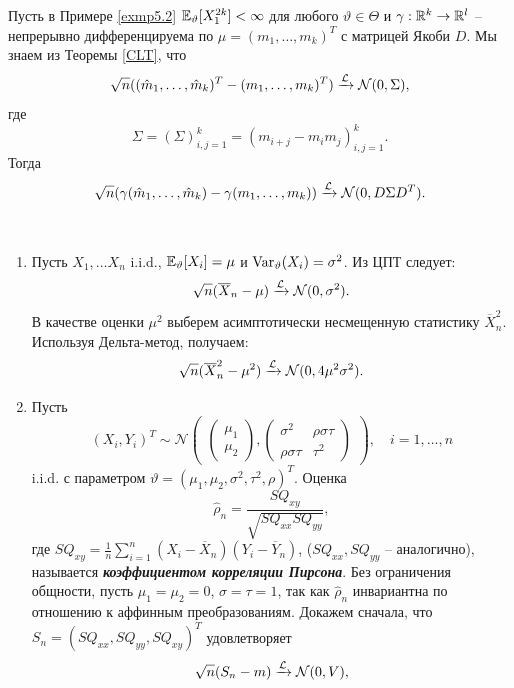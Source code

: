 \begin{rmrk}
	Пусть в Примере \ref{exmp5.2} $\mathbb{E}_\vartheta[X_1^{2k}] < \infty$ для любого $\vartheta \in \Theta$ и $\gamma:\mathbb{R}^k \rightarrow \mathbb{R}^l$ -- непрерывно дифференцируема по $\mu = (m_1, \dots, m_k)^T$ с матрицей Якоби $D$. Мы знаем из Теоремы \ref{CLT}, что
	\[ \sqrt{n}((\hat{m}_1, \dots, \hat{m}_k)^T - (m_1, \dots, m_k)^T) \xrightarrow{\mathcal{L}} \mathcal{N}(0, \Sigma),  \]
	где
	\[ \Sigma = (\Sigma)_{i,j=1}^k = (m_{i+j} - m_i m_j)_{i,j=1}^k. \]
	Тогда
	\[ \sqrt{n}(\gamma(\hat{m}_1, \dots, \hat{m}_k) - \gamma(m_1, \dots, m_k)) \xrightarrow{\mathcal{L}} \mathcal{N}(0, D \Sigma D^T).\]
\end{rmrk}

\begin{exmp}\
	\begin{enumerate}
		\item Пусть $X_1, \dots X_n$ i.i.d., $\mathbb{E}_\vartheta[X_i]=\mu$ и $\operatorname{Var}_\vartheta(X_i)=\sigma^2$. Из ЦПТ следует:
		\[ \sqrt{n}(\overline{X}_n - \mu) \xrightarrow{\mathcal{L}} \mathcal{N}(0, \sigma^2). \]
		В качестве оценки $\mu^2$ выберем асимптотически несмещенную статистику $\overline{X}_n^2$. Используя Дельта-метод, получаем:
		\[ \sqrt{n}(\overline{X}_n^2-\mu^2) \xrightarrow{\mathcal{L}} \mathcal{N}(0, 4\mu^2\sigma^2). \]
		\item Пусть \[(X_i, Y_i)^T \sim \mathcal{N}
		\begin{pmatrix}
		\begin{pmatrix}
		\mu_1 \\ \mu_2
		\end{pmatrix},
		\begin{pmatrix}
		\sigma^2 & \rho \sigma \tau \\
		\rho \sigma \tau & \tau^2
		\end{pmatrix}
		\end{pmatrix}, \quad
		i = 1, \dots, n \] i.i.d. с параметром $\vartheta = (\mu_1, \mu_2, \sigma^2, \tau^2, \rho)^T$. Оценка
		\[ \hat{\rho}_n = \frac{SQ_{xy}}{\sqrt{SQ_{xx} SQ_{yy}}},  \]
	    где $SQ_{xy} = \frac{1}{n} \sum_{i=1}^{n}(X_i-\overline{X}_n)(Y_i - \overline{Y}_n)$, ($SQ_{xx}, SQ_{yy}$ -- аналогично), называется \textbf{\textit{коэффициентом корреляции Пирсона}}. Без ограничения общности, пусть $\mu_1 = \mu_2 = 0$, $\sigma = \tau = 1$, так как $\hat{\rho}_n$ инвариантна по отношению к аффинным преобразованиям. Докажем сначала, что $S_n = (SQ_{xx}, SQ_{yy}, SQ_{xy})^T$ удовлетворяет
	    \begin{equation} \label{5.2}
	    	 \sqrt{n}(S_n - m) \xrightarrow{\mathcal{L}} \mathcal{N}(0, V),
	    \end{equation}

\end{enumerate}
\end{exmp}
